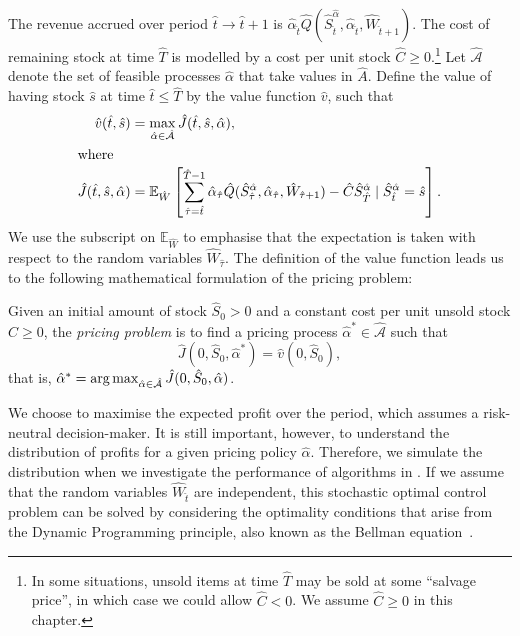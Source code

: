 \documentclass[main.tex]{subfiles}
\begin{document}
The revenue accrued over period $\hat{t}\to \hat{t}+1$ is
$\hat{\alpha}_{\hat{t}}\hat{Q}(\hat{S}_{\hat{t}}^{\hat{\alpha}},\hat{\alpha}_{\hat{t}},\hat{W}_{\hat{t}+1})$.
The cost of remaining stock at time $\hat{T}$ is modelled by a cost per unit
stock $\hat{C}\geq 0$.\footnote{In some situations, unsold items at time $\hat{T}$
  may be sold at some ``salvage price'', in which case we could allow
  $\hat{C}<0$. We assume $\hat{C}\geq 0$ in this chapter.}
Let $\hat{\mathcal{A}}$ denote the set of feasible processes $\hat{\alpha}$ that take values
in $\hat{A}$.
Define the value of having stock $\hat{s}$ at time $\hat{t}\leq \hat{T}$
by the value function $\hat{v}$, such that
\begin{align}\label{eq:value_function_def}
  \hat{v}(\hat{t},\hat{s})&=\max_{\hat{\alpha}\in\hat{\mathcal{A}}}
                            \hat{J}(\hat{t},\hat{s},\hat{\alpha}),\\
  \intertext{where}
  \hat{J}(\hat{t},\hat{s},\hat{\alpha})&=
                                         \mathbb{E}_{\hat{W}}\left[ \sum_{\hat{\tau}=\hat{t}}^{\hat{T}-1}
                                         \hat{\alpha}_{\hat{\tau}} \hat{Q}(\hat{S}_{\hat{\tau}}^{\hat{\alpha}},\hat{\alpha}_{\hat{\tau}},\hat{W}_{\hat{\tau}+1})
                                         - \hat{C}\hat{S}_{\hat{T}}^{\hat{\alpha}} \mid \hat{S}_{\hat{t}}^{\hat{\alpha}} = \hat{s}
                                         \right].
                                         \label{eq:value_function_def2}
\end{align}
We use the subscript on $\mathbb{E}_{\hat{W}}$ to emphasise that the
expectation is taken with respect to the random variables $\hat{W}_{\hat{\tau}}$.
The definition of the value function leads us to the following mathematical formulation of the pricing
problem:
\begin{mydef}
  Given an initial amount of stock $\hat{S}_0>0$ and a constant cost
  per unit unsold stock $\hat{C}\geq 0$, the \emph{pricing problem} is
  to find a pricing process $\hat{\alpha}^*\in\hat{\mathcal{A}}$ such
  that
  \begin{equation}
    \hat{J}(0,\hat{S}_0,\hat{\alpha}^*) = \hat{v}(0,\hat{S}_0),
  \end{equation}
  that is, $\hat{\alpha}^* = \operatorname*{arg\,max}_{\hat{\alpha}\in\hat{\mathcal{A}}}\hat{J}(0,\hat{S}_0,\hat{\alpha})$.
\end{mydef}
We choose to maximise the expected profit over the period, which
assumes a risk-neutral decision-maker.
It is still
important, however,
to understand the distribution of profits for a given pricing policy
$\hat{\alpha}$. Therefore, we simulate the distribution when
we investigate the performance of algorithms in
. %
If we assume that the random variables $\hat{W}_{\hat{t}}$ are independent, this
stochastic optimal control problem can be solved by
considering the optimality conditions that arise from the Dynamic
Programming principle, also known as the Bellman equation~\citep{bertsekas2005dynamic}.
\end{document}
